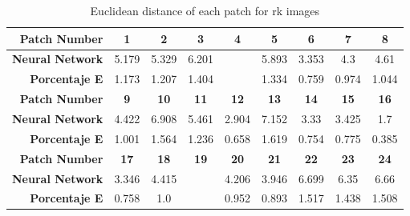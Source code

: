 \begin{table}[H]
  \caption{Euclidean distance of each patch for rk images }
  \begin{center}
    \begin{tabularx}{\textwidth}{r c c c c c c c c}
    \toprule
        \textbf{Patch Number} & \textbf{1} & \textbf{2} & \textbf{3} & \textbf{4} & \textbf{5} & \textbf{6} & \textbf{7} & \textbf{8}\\ \midrule 
        \textbf{Neural Network} &5.179 &5.329 &6.201 &\cellcolor{colorred}{7.442} &5.893 &3.353 &4.3 &4.61\\ 
        \textbf{Porcentaje E} &1.173 &1.207 &1.404 &\cellcolor{colorred}{1.685} &1.334 &0.759 &0.974 &1.044\\ \midrule 
        \textbf{Patch Number} & \textbf{9} & \textbf{10} & \textbf{11} & \textbf{12} & \textbf{13} & \textbf{14} & \textbf{15} & \textbf{16}\\ \midrule 
        \textbf{Neural Network} &4.422 &6.908 &5.461 &2.904 &7.152 &3.33 &3.425 &1.7\\ 
        \textbf{Porcentaje E} &1.001 &1.564 &1.236 &0.658 &1.619 &0.754 &0.775 &0.385\\ \midrule 
        \textbf{Patch Number} & \textbf{17} & \textbf{18} & \textbf{19} & \textbf{20} & \textbf{21} & \textbf{22} & \textbf{23} & \textbf{24}\\ \midrule 
        \textbf{Neural Network} &3.346 &4.415 &\cellcolor{colorgreen}{1.316} &4.206 &3.946 &6.699 &6.35 &6.66\\ 
        \textbf{Porcentaje E} &0.758 &1.0 &\cellcolor{colorgreen}{0.298} &0.952 &0.893 &1.517 &1.438 &1.508\\ \midrule 
    \bottomrule
    \end{tabularx}
  \end{center}
\end{table}

